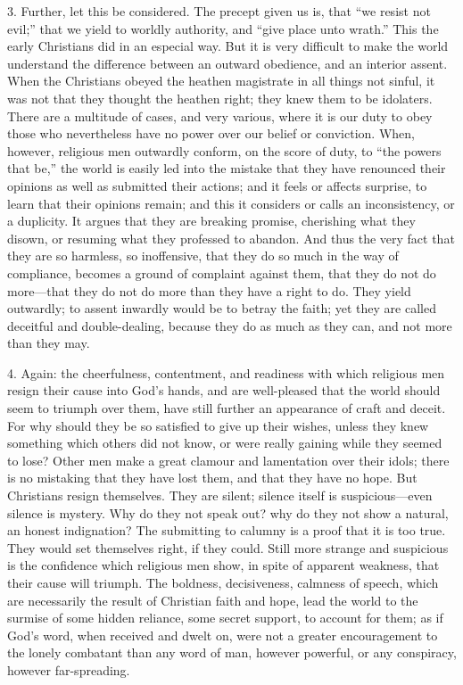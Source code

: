 3. Further, let this be considered. The precept given us is, that
``we resist not evil;'' that we yield to worldly authority,
and ``give place unto wrath.'' This the early Christians did
in an especial way. But it is very difficult to make the world
understand the difference between an outward obedience, and an
interior assent. When the Christians obeyed the heathen magistrate in
all things not sinful, it was not that they thought the heathen right;
they knew them to be idolaters. There are a multitude of cases, and
very various, where it is our duty to obey those who nevertheless have
no power over our belief or conviction. When, however, religious men
outwardly conform, on the score of duty, to ``the powers that
be,'' the world is easily led into the mistake that they have
renounced their opinions as well as submitted their actions; and it
feels or affects surprise, to learn that their opinions remain; and
this it considers or calls an inconsistency, or a duplicity. It argues
that they are breaking promise, cherishing what they disown, or
resuming what they professed to abandon. And thus the very fact that
they are so harmless, so inoffensive, that they do so much in the way
of compliance, becomes a ground of complaint against them, that they
do not do more—that they do not do more than they have a right to
do. They yield outwardly; to assent inwardly would be to betray the
faith; yet they are called deceitful and double-dealing, because they
do as much as they can, and not more than they may.

4. Again: the cheerfulness, contentment, and readiness with which
religious men resign their cause into God's hands, and are
well-pleased that the world should seem to triumph over them, have
still further an appearance of craft and deceit. For why should they
be so satisfied to give up their wishes, unless they knew something
which others did not know, or were really gaining while they seemed to
lose? Other men make a great clamour and lamentation over their idols;
there is no mistaking that they have lost them, and that they have no
hope. But Christians resign themselves. They are silent; silence
itself is suspicious—even silence is mystery. Why do they not speak
out? why do they not show a natural, an honest indignation? The
submitting to calumny is a proof that it is too true. They would set
themselves right, if they could. Still more strange and suspicious is
the confidence which religious men show, in spite of apparent
weakness, that their cause will triumph. The boldness, decisiveness,
calmness of speech, which are necessarily the result of Christian
faith and hope, lead the world to the surmise of some hidden reliance,
some secret support, to account for them; as if God's word, when
received and dwelt on, were not a greater encouragement to the lonely
combatant than any word of man, however powerful, or any conspiracy,
however far-spreading.

